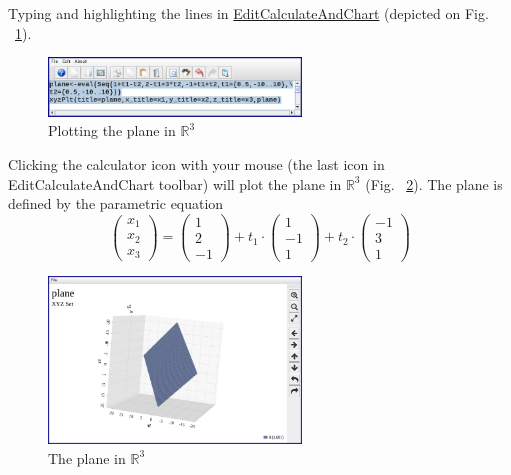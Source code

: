 \documentclass[color=black,11pt]{elegantpaper}
\begin{document}
\begin{example}
Typing and highlighting the lines in \href{https://github.com/mathhobbit/EditCalculateAndChart/releases}{EditCalculateAndChart} (depicted on Fig. ~\ref{fig:3dplane}).
\begin{figure}[htbp]
  \centering
  \includegraphics[width=0.6\textwidth]{image/3dplane.png}
  \caption{Plotting the plane in $\mathbb{R}^3$}
  \label{fig:3dplane}
\end{figure}
Clicking the calculator icon with your mouse (the last icon in EditCalculateAndChart toolbar) will plot the plane in $\mathbb{R}^3$ (Fig. ~\ref{fig:3dplanePlot}). The plane is defined by the parametric equation
$$
\left(\begin{array}{c}
x_1\\
x_2\\
x_3
\end{array}\right) = \left(\begin{array}{c}
                              1\\
                              2\\
                             -1 
                   \end{array}\right) + t_1 \cdot \left(\begin{array}{c}
                                      1\\
                                      -1\\
                                       1 
                                       \end{array}\right) +t_2 \cdot \left(\begin{array}{c}
                                                                              -1\\
                                                                               3\\
                                                                               1
                                                                          \end{array}\right)
$$
\begin{figure}[htbp]
  \centering
  \includegraphics[width=0.6\textwidth]{image/3dplanePlot.png}
  \caption{The plane in $\mathbb{R}^3$}
  \label{fig:3dplanePlot}
\end{figure}
\end{example}
\end{document}
